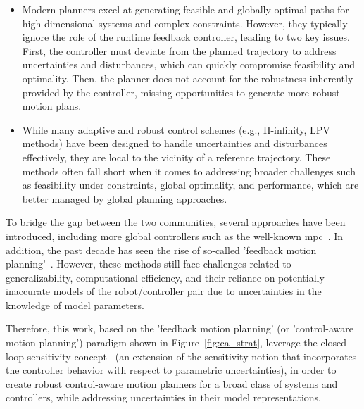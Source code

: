 \begin{itemize}
  \item Modern planners excel at generating feasible and globally optimal paths for high-dimensional systems and complex constraints. 
  However, they typically ignore the role of the runtime feedback controller, leading to two key issues.
  First, the controller must deviate from the planned trajectory to address uncertainties and disturbances, which can quickly compromise feasibility and optimality.
  Then, the planner does not account for the robustness inherently provided by the controller, missing opportunities to generate more robust motion plans.
  \item While many adaptive and robust control schemes (e.g., H-infinity, LPV methods) have been designed to handle uncertainties and disturbances effectively, they are local to the vicinity of a reference trajectory. 
  These methods often fall short when it comes to addressing broader challenges such as feasibility under constraints, global optimality, and performance, which are better managed by global planning approaches.
\end{itemize}
    
To bridge the gap between the two communities, several approaches have been introduced, including more global controllers such as the well-known \gls{mpc}~\cite{cTMPC}. 
In addition, the past decade has seen the rise of so-called 'feedback motion planning'~\cite{cControlAwareAerialManip, cContractThMP, cContractThOnlineMP, cMajundarLibrary, cFaSTrack, cRandUpRRT, cRandUP}. 
However, these methods still face challenges related to generalizability, computational efficiency, and their reliance on potentially inaccurate models of the robot/controller pair due to uncertainties in the knowledge of model parameters.

Therefore, this work, based on the 'feedback motion planning' (or 'control-aware motion planning') paradigm shown in Figure~\ref{fig:ca_strat}, leverage the closed-loop sensitivity concept~\cite{cPi,cTh} (an extension of the sensitivity notion that incorporates the controller behavior with respect to parametric uncertainties), in order to create robust control-aware motion planners for a broad class of systems and controllers, while addressing uncertainties in their model representations.

